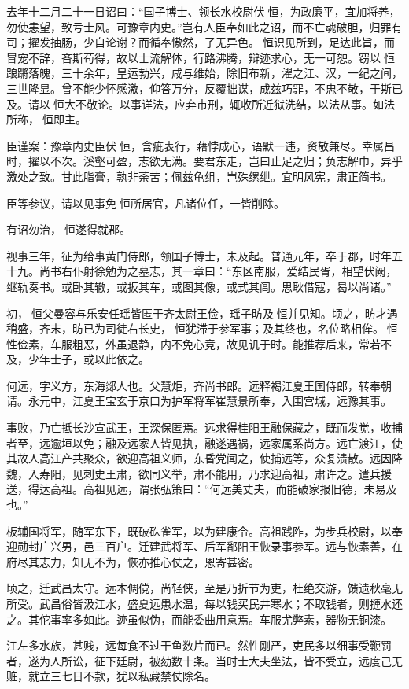 \documentclass[12pt,UTF8]{ctexbook}
\begin{document}
去年十二月二十一日诏曰：“国子博士、领长水校尉伏恒，为政廉平，宜加将养，勿使恚望，致亏士风。可豫章内史。”岂有人臣奉如此之诏，而不亡魂破胆，归罪有司；擢发抽肠，少自论谢？而循奉慠然，了无异色。恒识见所到，足达此旨，而冒宠不辞，吝斯苟得，故以士流解体，行路沸腾，辩迹求心，无一可恕。窃以恒踉蹡落魄，三十余年，皇运勃兴，咸与维始，除旧布新，濯之江、汉，一纪之间，三世隆显。曾不能少怀感激，仰答万分，反覆拙谋，成兹巧罪，不忠不敬，于斯已及。请以恒大不敬论。以事详法，应弃市刑，辄收所近狱洗结，以法从事。如法所称，恒即主。

臣谨案：豫章内史臣伏恒，含疵表行，藉悖成心，语默一违，资敬兼尽。幸属昌时，擢以不次。溪壑可盈，志欲无满。要君东走，岂曰止足之归；负志解巾，异乎激处之致。甘此脂膏，孰非荼苦；佩兹龟组，岂殊缧绁。宜明风宪，肃正简书。

臣等参议，请以见事免恒所居官，凡诸位任，一皆削除。

有诏勿治，恒遂得就郡。

视事三年，征为给事黄门侍郎，领国子博士，未及起。普通元年，卒于郡，时年五十九。尚书右仆射徐勉为之墓志，其一章曰：“东区南服，爱结民胥，相望伏阙，继轨奏书。或卧其辙，或扳其车，或图其像，或式其闾。思耿借寇，曷以尚诸。”

初，恒父曼容与乐安任瑶皆匿于齐太尉王俭，瑶子昉及恒并见知。顷之，昉才遇稍盛，齐末，昉已为司徒右长史，恒犹滞于参军事；及其终也，名位略相侔。恒性俭素，车服粗恶，外虽退静，内不免心竞，故见讥于时。能推荐后来，常若不及，少年士子，或以此依之。

何远，字义方，东海郯人也。父慧炬，齐尚书郎。远释褐江夏王国侍郎，转奉朝请。永元中，江夏王宝玄于京口为护军将军崔慧景所奉，入围宫城，远豫其事。

事败，乃亡抵长沙宣武王，王深保匿焉。远求得桂阳王融保藏之，既而发觉，收捕者至，远逾垣以免；融及远家人皆见执，融遂遇祸，远家属系尚方。远亡渡江，使其故人高江产共聚众，欲迎高祖义师，东昏党闻之，使捕远等，众复溃散。远因降魏，入寿阳，见刺史王肃，欲同义举，肃不能用，乃求迎高祖，肃许之。遣兵援送，得达高祖。高祖见远，谓张弘策曰：“何远美丈夫，而能破家报旧德，未易及也。”

板辅国将军，随军东下，既破硃雀军，以为建康令。高祖践阼，为步兵校尉，以奉迎勋封广兴男，邑三百户。迁建武将军、后军鄱阳王恢录事参军。远与恢素善，在府尽其志力，知无不为，恢亦推心仗之，恩寄甚密。

顷之，迁武昌太守。远本倜傥，尚轻侠，至是乃折节为吏，杜绝交游，馈遗秋毫无所受。武昌俗皆汲江水，盛夏远患水温，每以钱买民井寒水；不取钱者，则摙水还之。其佗事率多如此。迹虽似伪，而能委曲用意焉。车服尤弊素，器物无铜漆。

江左多水族，甚贱，远每食不过干鱼数片而已。然性刚严，吏民多以细事受鞭罚者，遂为人所讼，征下廷尉，被劾数十条。当时士大夫坐法，皆不受立，远度己无赃，就立三七日不款，犹以私藏禁仗除名。
\end{document}

